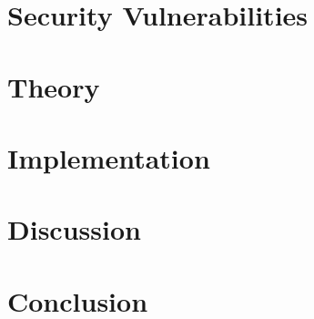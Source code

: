 \chapter{Security Vulnerabilities}


\chapter{Theory}
















\chapter{Implementation}













\chapter{Discussion}




\chapter{Conclusion}


\appendix







\printbibliography

